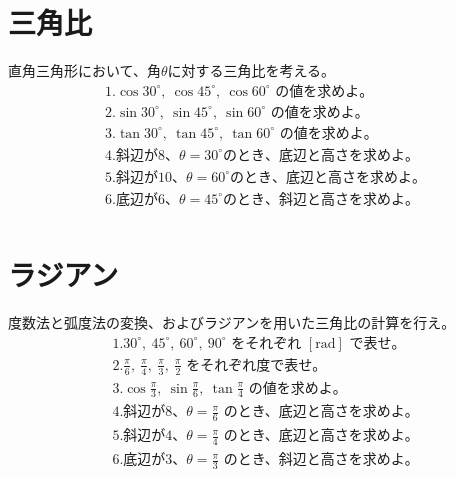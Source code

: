 \documentclass[paper=b4j,landscape,twocolumn,fleqn]{jlreq}
\begin{document}
\section{三角比}
直角三角形において、角$\theta$に対する三角比を考える。
\begin{align*}
　&1.　\cos 30^\circ,\ \cos 45^\circ,\ \cos 60^\circ\text{ の値を求めよ。}\\[0.45em]
　&2.　\sin 30^\circ,\ \sin 45^\circ,\ \sin 60^\circ\text{ の値を求めよ。}\\[0.45em]
　&3.　\tan 30^\circ,\ \tan 45^\circ,\ \tan 60^\circ\text{ の値を求めよ。}\\[0.45em]
　&4.　斜辺が8、\theta=30^\circ のとき、底辺と高さを求めよ。\\[0.45em]
　&5.　斜辺が10、\theta=60^\circ のとき、底辺と高さを求めよ。\\[0.45em]
　&6.　底辺が6、\theta=45^\circ のとき、斜辺と高さを求めよ。\\[0.45em]
\end{align*}

\newpage

\section{ラジアン}
度数法と弧度法の変換、およびラジアンを用いた三角比の計算を行え。
\begin{align*}
　&1.　30^\circ,\ 45^\circ,\ 60^\circ,\ 90^\circ\text{ をそれぞれ }[\mathrm{rad}]\text{ で表せ。}\\[0.45em]
　&2.　\frac{\pi}{6},\ \frac{\pi}{4},\ \frac{\pi}{3},\ \frac{\pi}{2}\text{ をそれぞれ度で表せ。}\\[0.45em]
　&3.　\cos \frac{\pi}{3},\ \sin \frac{\pi}{6},\ \tan \frac{\pi}{4}\text{ の値を求めよ。}\\[0.45em]
　&4.　斜辺が8、\theta=\frac{\pi}{6}\text{ のとき、底辺と高さを求めよ。}\\[0.45em]
　&5.　斜辺が4、\theta=\frac{\pi}{4}\text{ のとき、底辺と高さを求めよ。}\\[0.45em]
　&6.　底辺が3、\theta=\frac{\pi}{3}\text{ のとき、斜辺と高さを求めよ。}\\[0.45em]
\end{align*}
\end{document}
